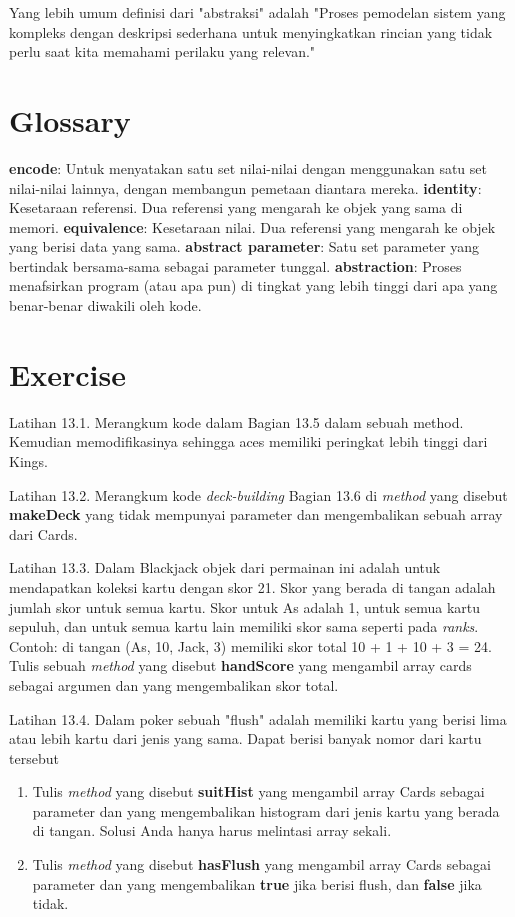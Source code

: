 \documentclass[12pt,b5paper,openright,twoside]{book}
\begin{document}
\noindent Yang lebih umum definisi dari "abstraksi" adalah "Proses pemodelan sistem yang kompleks dengan deskripsi sederhana untuk menyingkatkan rincian yang tidak perlu saat kita memahami perilaku yang relevan."

\section{Glossary}
\textbf{encode}: Untuk menyatakan satu set nilai-nilai dengan menggunakan satu set nilai-nilai lainnya, dengan membangun pemetaan diantara mereka.
\textbf{identity}: Kesetaraan referensi. Dua referensi yang mengarah ke objek yang sama di memori.
\textbf{equivalence}: Kesetaraan nilai. Dua referensi yang mengarah ke objek yang berisi data yang sama.
\textbf{abstract parameter}: Satu set parameter yang bertindak bersama-sama sebagai parameter tunggal.
\textbf{abstraction}: Proses menafsirkan program (atau apa pun) di tingkat yang lebih tinggi dari apa yang benar-benar diwakili oleh kode.

\section{Exercise}
Latihan 13.1. Merangkum kode dalam Bagian 13.5 dalam sebuah method. Kemudian memodifikasinya sehingga aces memiliki peringkat lebih tinggi dari Kings.

\noindent Latihan 13.2. Merangkum kode \textit{deck-building} Bagian 13.6 di \textit{method} yang disebut \textbf{makeDeck} yang tidak mempunyai parameter dan mengembalikan sebuah array dari Cards.

\noindent Latihan 13.3. Dalam Blackjack objek dari permainan ini adalah untuk mendapatkan koleksi kartu dengan skor 21. Skor yang berada di tangan adalah jumlah skor untuk semua kartu. Skor untuk As adalah 1, untuk semua kartu sepuluh, dan untuk semua kartu lain memiliki skor sama seperti pada \textit{ranks}. Contoh: di tangan (As, 10, Jack, 3) memiliki skor total 10 + 1 + 10 + 3 = 24.
Tulis sebuah \textit{method} yang disebut \textbf{handScore} yang mengambil array cards sebagai argumen dan yang mengembalikan skor total.

\noindent Latihan 13.4. Dalam poker sebuah "flush" adalah memiliki kartu yang berisi lima atau lebih kartu dari jenis yang sama. Dapat berisi banyak nomor dari kartu tersebut
\begin{enumerate}
    \item Tulis \textit{method} yang disebut \textbf{suitHist} yang mengambil array Cards sebagai parameter dan yang mengembalikan histogram dari jenis kartu yang berada di tangan. Solusi Anda hanya harus melintasi array sekali.
    \item Tulis \textit{method} yang disebut \textbf{hasFlush} yang mengambil array Cards sebagai parameter dan yang mengembalikan \textbf{true} jika berisi flush, dan \textbf{false} jika tidak.
\end{enumerate}
\end{document}
